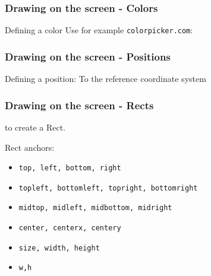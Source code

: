 \documentclass[handout]{beamer}   %
\newcommand{\source}[1]{\begin{textblock*}{4cm}(8.7cm,8.6cm)
    \begin{beamercolorbox}[ht=0.5cm,right]{framesource}
        \usebeamerfont{framesource}\usebeamercolor[fg]{framesource} Source: {#1}
    \end{beamercolorbox}
\end{textblock*}}
\begin{document}
\begin{frame}
\frametitle{Drawing on the screen - Colors}

Defining a color
\bigskip
\pause
Use for example \textcolor{tg}{\texttt{colorpicker.com}}:
\end{frame}


\begin{frame}
\frametitle{Drawing on the screen - Positions}

Defining a position:
\bigskip
\pause
To the reference coordinate system
\end{frame}


\begin{frame}
\frametitle{Drawing on the screen - Rects}
\rectCode
to create a Rect. 
\pause
\vspace{0.4cm}

\drawRect
\pause 
Rect anchors:
\begin{itemize}
\item[]    \textcolor{tg}{\texttt{top, left, bottom, right}}
\item[]    \textcolor{tg}{\texttt{topleft, bottomleft, topright, bottomright}}
\item[]    \textcolor{tg}{\texttt{midtop, midleft, midbottom, midright}}
\item[]    \textcolor{tg}{\texttt{center, centerx, centery}}
\item[]    \textcolor{tg}{\texttt{size, width, height}}
\item[]    \textcolor{tg}{\texttt{w,h}}
\end{itemize}

\end{frame}
\end{document}
